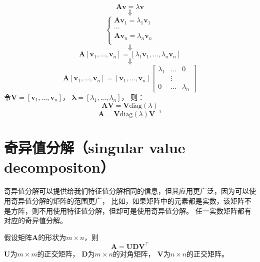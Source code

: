 \begin{tcolorbox}
  \begin{equation}
    \bm{Av} = \lambda\bm{v} 
  \end{equation}
  \begin{equation*}
    \Downarrow
  \end{equation*}
  \begin{equation}
    \begin{cases}
      \bm{Av}_1 = \lambda_1\bm{v}_1 \\
      \cdots \\
      \bm{Av}_n = \lambda_n\bm{v}_n \\
    \end{cases}
  \end{equation}
  \begin{equation*}
    \Downarrow
  \end{equation*}
  \begin{equation}
    \bm{A}[\bm{v}_1,\dots,\bm{v}_n] = [\lambda_1\bm{v}_1, \dots, \lambda_n\bm{v}_n]
  \end{equation}
  \begin{equation*}
    \Downarrow
  \end{equation*}
  \begin{equation}
    \bm{A}[\bm{v}_1,\dots,\bm{v}_n] = [\bm{v}_1,\dots,\bm{v}_n]
    \begin{bmatrix}
      \lambda_1 & \dots & 0 \\
      & \vdots & \\
      0 & \dots & \lambda_n
    \end{bmatrix}
  \end{equation}
  令$\bm{V} = [\bm{v}_1,\dots,\bm{v}_n]$，
  $\bm{\lambda} = [\lambda_1, ... , \lambda_n]$，
  则：
  \begin{equation}
    \bm{AV} = \bm{V}\text{diag}(\lambda)
  \end{equation}
  \begin{equation*}
    \bm{A} = \bm{V}\text{diag}(\lambda)\bm{V}^{-1}
  \end{equation*}
\end{tcolorbox}

\section{奇异值分解（singular value decompositon）}
奇异值分解可以提供给我们特征值分解相同的信息，但其应用更广泛，因为可以使用奇异值分解的矩阵的范围更广，
比如，如果矩阵中的元素都是实数，该矩阵不是方阵，则不用使用特征值分解，但却可是使用奇异值分解。
任一实数矩阵都有对应的奇异值分解。


假设矩阵$\bm{A}$的形状为$m\times n$，则
\begin{equation}
  \label{eq:svd}
  \bm{A=UDV}^\top
\end{equation}
$\bm{U}$为$m\times m$的正交矩阵，
$\bm{D}$为$m\times n$的对角矩阵，
$\bm{V}$为$n\times n$的正交矩阵。

